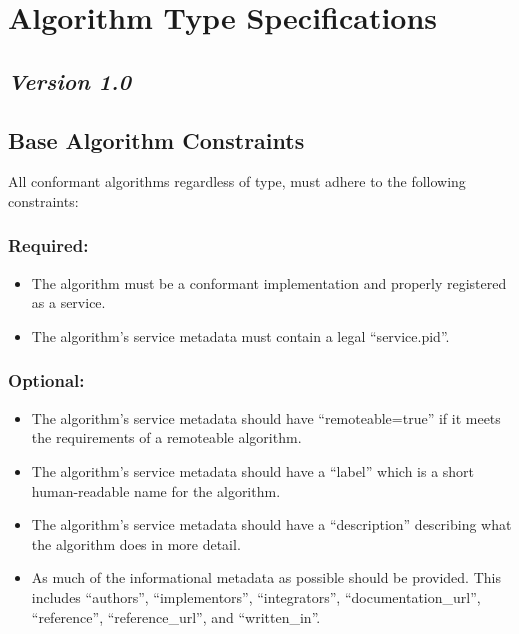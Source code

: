 \section{Algorithm Type Specifications}

\subsection*{\textit{Version 1.0}}

\label{algConstraints}

\subsection{Base Algorithm Constraints}

All conformant algorithms regardless of type, must adhere to the following
constraints:

\subsubsection*{Required:}
\begin{itemize}
  \item The algorithm must be a conformant 
  implementation and properly registered as a service.
  \item The algorithm's service metadata must contain a legal ``service.pid''.
\end{itemize}

\subsubsection*{Optional:}
\begin{itemize}
  \item The algorithm's service metadata should have ``remoteable=true'' if it
  meets the requirements of a remoteable algorithm.
  \item The algorithm's service metadata should have a ``label'' which is a
  short human-readable name for the algorithm.
  \item The algorithm's service metadata should have a ``description''
  describing what the algorithm does in more detail.
  \item As much of the informational metadata as possible should be
  provided. This includes ``authors'', ``implementors'', ``integrators'',
  ``documentation\_url'', ``reference'', ``reference\_url'', and ``written\_in''.
\end{itemize}

